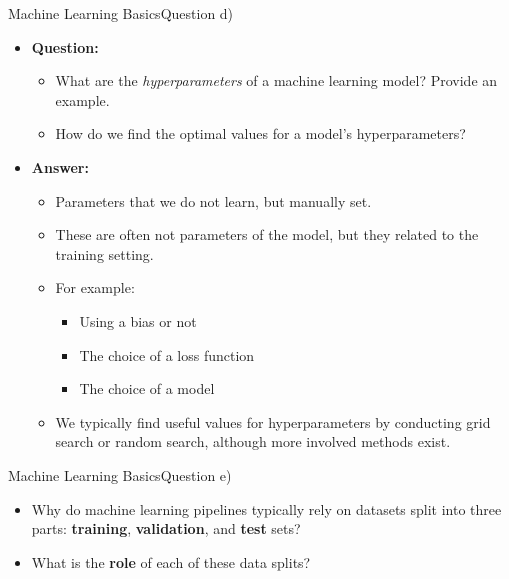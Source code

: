 \documentclass[t]{beamer}
\begin{document}
\begin{frame}{Machine Learning Basics}{Question d)}
    \begin{itemize}
        \item \textbf{Question:}
              \begin{itemize}
                  \item What are the \textit{hyperparameters} of a machine
                        learning model?
                        Provide an example.
                  \item How do we find the optimal values for a model's
                        hyperparameters?
              \end{itemize}
              \pause
        \item \textbf{Answer:}
              \begin{itemize}
                  \item Parameters that we do not learn, but manually set.
                  \item These are often not parameters of the model, but they
                        related to the training setting.
                  \item For example:
                        \begin{itemize}
                            \item Using a bias or not
                            \item The choice of a loss function
                            \item The choice of a model
                        \end{itemize}
                  \item We typically find useful values for hyperparameters by
                        conducting grid search or random search, although more
                        involved methods exist.
              \end{itemize}
    \end{itemize}
\end{frame}

\begin{frame}{Machine Learning Basics}{Question e)}
    \begin{itemize}
        \item Why do machine learning pipelines typically rely on
              datasets split into three parts: \textbf{training},
              \textbf{validation}, and \textbf{test} sets?
        \item What is the \textbf{role} of each of these data splits?
    \end{itemize}
\end{frame}
\end{document}
